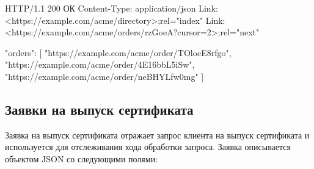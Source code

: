 \begin{codeblock}
HTTP/1.1 200 ОК
Content-Type: application/json
Link: <https://example.com/acme/directory>;rel="index"
Link: <https://example.com/acme/orders/rzGoeA?cursor=2>;rel="next"

{
  "orders": [
    "https://example.com/acme/order/TOlocE8rfgo",
    "https://example.com/acme/order/4E16bbL5iSw",
    "https://example.com/acme/order/neBHYLfw0mg"
  ]
}
\end{codeblock}
\fi

\subsection{Заявки на выпуск сертификата}\label{ACME.Res.Order}

Заявка на выпуск сертификата отражает запрос клиента на выпуск сертификата 
и используется для отслеживания хода обработки запроса. Заявка описывается 
объектом JSON со следующими полями:


